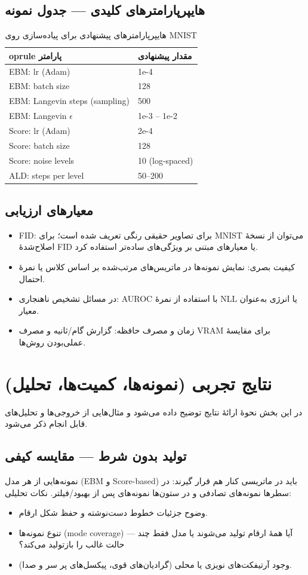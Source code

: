 \subsection{هایپرپارامترهای کلیدی — جدول نمونه}
\begin{table}[h!]
\centering
\caption{هایپرپارامترهای پیشنهادی برای پیاده‌سازی روی MNIST}
\begin{tabular}{l l}
	oprule
پارامتر & مقدار پیشنهادی \\
\midrule
EBM: lr (Adam) & 1e-4 \\
EBM: batch size & 128 \\
EBM: Langevin steps (sampling) & 500 \\
EBM: Langevin \(\epsilon\) & 1e-3 -- 1e-2 \\
Score: lr (Adam) & 2e-4 \\
Score: batch size & 128 \\
Score: noise levels & 10 (log-spaced) \\
ALD: steps per level & 50--200 \\
\bottomrule
\end{tabular}
\end{table}

\subsection{معیارهای ارزیابی}
\begin{itemize}
    \item FID: برای تصاویر حقیقی رنگی تعریف شده است؛ برای MNIST می‌توان از نسخهٔ اصلاح‌شدهٔ FID یا معیارهای مبتنی بر ویژگی‌های ساده‌تر استفاده کرد.
    \item کیفیت بصری: نمایش نمونه‌ها در ماتریس‌های مرتب‌شده بر اساس کلاس یا نمرهٔ احتمال.
    \item در مسائل تشخیص ناهنجاری: AUROC با استفاده از نمرهٔ NLL یا انرژی به‌عنوان معیار.
    \item زمان و مصرف حافظه: گزارش گام/ثانیه و مصرف VRAM برای مقایسهٔ عملی‌بودن روش‌ها.
\end{itemize}

\section{نتایج تجربی (نمونه‌ها، کمیت‌ها، تحلیل)}
در این بخش نحوهٔ ارائهٔ نتایج توضیح داده می‌شود و مثال‌هایی از خروجی‌ها و تحلیل‌های قابل انجام ذکر می‌شود.

\subsection{تولید بدون شرط — مقایسه کیفی}
نمونه‌هایی از هر مدل (EBM و Score-based) باید در ماتریسی کنار هم قرار گیرند: در سطرها نمونه‌های تصادفی و در ستون‌ها نمونه‌های پس از بهبود/فیلتر. نکات تحلیلی:
\begin{itemize}
    \item وضوح جزئیات خطوط دست‌نوشته و حفظ شکل ارقام.
    \item تنوع نمونه‌ها (mode coverage) — آیا همهٔ ارقام تولید می‌شوند یا مدل فقط چند حالت غالب را بازتولید می‌کند؟
    \item وجود آرتیفکت‌های نویزی یا محلی (گرادیان‌های قوی، پیکسل‌های پر سر و صدا).
\end{itemize}

